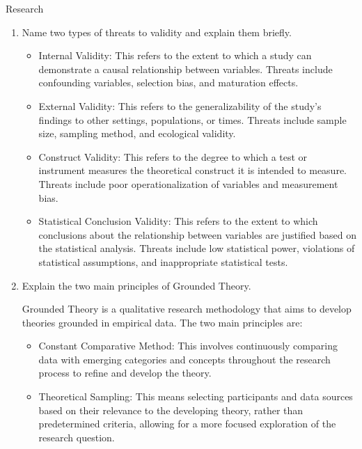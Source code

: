 \documentclass{article}
\author{Leopold Lemmermann}
\begin{document}
\createtitle


\begin{exercise}{Research}
  \begin{enumerate}
    \item Name two types of threats to validity and explain them briefly. \begin{solution}
        \begin{itemize}
          \item Internal Validity: This refers to the extent to which a study can demonstrate a causal relationship between variables. Threats include confounding variables, selection bias, and maturation effects.
          \item External Validity: This refers to the generalizability of the study's findings to other settings, populations, or times. Threats include sample size, sampling method, and ecological validity.
          \item Construct Validity: This refers to the degree to which a test or instrument measures the theoretical construct it is intended to measure. Threats include poor operationalization of variables and measurement bias.
          \item Statistical Conclusion Validity: This refers to the extent to which conclusions about the relationship between variables are justified based on the statistical analysis. Threats include low statistical power, violations of statistical assumptions, and inappropriate statistical tests.
        \end{itemize}
      \end{solution}

    \item Explain the two main principles of Grounded Theory. \begin{solution}
        Grounded Theory is a qualitative research methodology that aims to develop theories grounded in empirical data. The two main principles are:
        \begin{itemize}
          \item Constant Comparative Method: This involves continuously comparing data with emerging categories and concepts throughout the research process to refine and develop the theory.
          \item Theoretical Sampling: This means selecting participants and data sources based on their relevance to the developing theory, rather than predetermined criteria, allowing for a more focused exploration of the research question.
        \end{itemize}
      \end{solution}


\end{enumerate}
\end{exercise}
\end{document}
